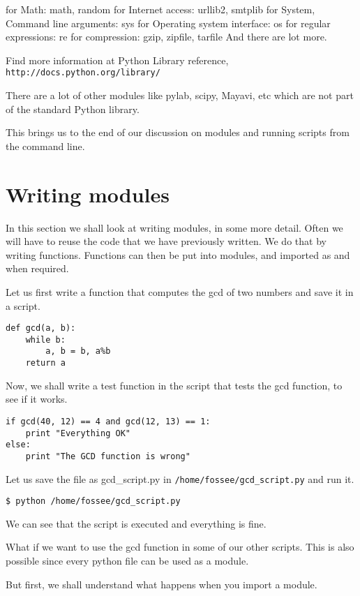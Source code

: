 \documentclass[presentation]{beamer}
\begin{document}
for Math: math, random for Internet access: urllib2, smtplib for System,
Command line arguments: sys for Operating system interface: os for
regular expressions: re for compression: gzip, zipfile, tarfile And
there are lot more.

Find more information at Python Library reference,
\texttt{http://docs.python.org/library/}

There are a lot of other modules like pylab, scipy, Mayavi, etc which
are not part of the standard Python library.

This brings us to the end of our discussion on modules and running
scripts from the command line.
\section{Writing modules}
\label{sec-2}


In this section we shall look at writing modules, in some more detail.
Often we will have to reuse the code that we have previously written. We
do that by writing functions. Functions can then be put into modules,
and imported as and when required.

Let us first write a function that computes the gcd of two numbers and
save it in a script.

\begin{verbatim}
def gcd(a, b):
    while b:
        a, b = b, a%b
    return a
\end{verbatim}

Now, we shall write a test function in the script that tests the gcd
function, to see if it works.

\begin{verbatim}
if gcd(40, 12) == 4 and gcd(12, 13) == 1:
    print "Everything OK"
else:
    print "The GCD function is wrong"
\end{verbatim}

Let us save the file as gcd\_script.py in \texttt{/home/fossee/gcd\_script.py}
and run it.

\begin{verbatim}
$ python /home/fossee/gcd_script.py
\end{verbatim}

We can see that the script is executed and everything is fine.

What if we want to use the gcd function in some of our other scripts.
This is also possible since every python file can be used as a module.

But first, we shall understand what happens when you import a module.
\end{document}
